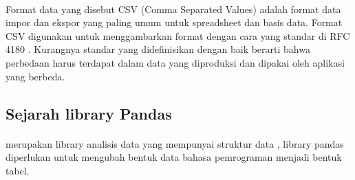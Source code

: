 \documentclass{article}
\begin{document}
        \paragraph{} Format data yang disebut CSV (Comma Separated Values) adalah format data impor dan ekspor yang paling umum untuk spreadsheet dan basis data. Format CSV digunakan untuk menggambarkan format dengan cara yang standar di RFC 4180 . Kurangnya standar yang didefinisikan dengan baik berarti bahwa perbedaan harus terdapat dalam data yang diproduksi dan dipakai oleh aplikasi yang berbeda.
        
    \subsection{Sejarah library Pandas}
        \paragraph{}merupakan library analisis data yang mempunyai struktur data , library pandas diperlukan untuk mengubah bentuk data bahasa pemrograman menjadi bentuk tabel. 
    
\end{document}
